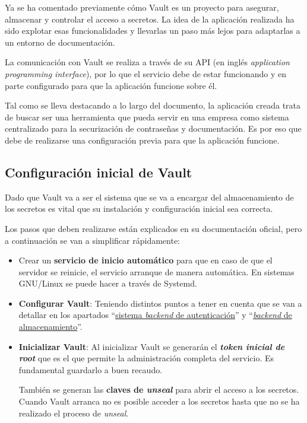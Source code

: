 \documentclass{\ClassPath/viu-tfm-template}
\begin{document}
Ya se ha comentado previamente cómo Vault es un proyecto para asegurar, almacenar y controlar el acceso a secretos. La idea de la aplicación realizada ha sido explotar esas funcionalidades y llevarlas un paso más lejos para adaptarlas a un entorno de documentación.

La comunicación con Vault se realiza a través de su API (en inglés \textit{application programming interface}), por lo que el servicio debe de estar funcionando y en parte configurado para que la aplicación funcione sobre él.

Tal como se lleva destacando a lo largo del documento, la aplicación creada trata de buscar ser una herramienta que pueda servir en una empresa como sistema centralizado para la securización de contraseñas y documentación. Es por eso que debe de realizarse una configuración previa para que la aplicación funcione.

\subsection{Configuración inicial de Vault}

Dado que Vault va a ser el sistema que se va a encargar del almacenamiento de los secretos es vital que su instalación y configuración inicial sea correcta.

Los pasos que deben realizarse están explicados en su documentación oficial, pero a continuación se van a simplificar rápidamente:

\begin{itemize}
    \item Crear un \textbf{servicio de inicio automático} para que en caso de que el servidor se reinicie, el servicio arranque de manera automática. En sistemas GNU/Linux se puede hacer a través de Systemd.
    \item \textbf{Configurar Vault}: Teniendo distintos puntos a tener en cuenta que se van a detallar en los apartados “\hyperlink{sistema_backend}{sistema \textit{backend} de autenticación}” y “\hyperlink{backend_almacenamiento}{\textit{backend} de almacenamiento}”.
    \item \textbf{Inicializar Vault}: Al inicializar Vault se generarán el \textit{\textbf{token inicial de root}} que es el que permite la administración completa del servicio. Es fundamental guardarlo a buen recaudo.

    También se generan las \textbf{claves de \textit{unseal}} para abrir el acceso a los secretos. Cuando Vault arranca no es posible acceder a los secretos hasta que no se ha realizado el proceso de \textit{unseal}.
\end{itemize}
\end{document}
